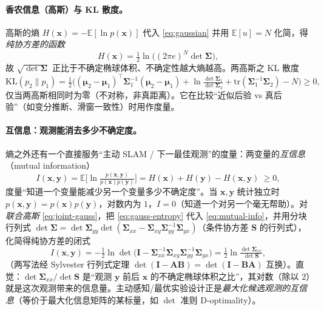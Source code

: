 \paragraph{香农信息（高斯）与 KL 散度。}
高斯的熵 $H(\mathbf{x})=-\mathbb{E}[\ln p(\mathbf{x})]$ 代入 \cref{eq:gaussian} 并用 $\mathbb{E}[u]=N$ 化简，得\emph{纯协方差的函数}
\begin{equation}
  H(\mathbf{x})=\tfrac12\ln\big((2\pi e)^N\det\boldsymbol{\Sigma}\big),
  \label{eq:gauss-entropy}
\end{equation}
故 $\sqrt{\det\boldsymbol{\Sigma}}$ 正比于不确定椭球体积、不确定性越大熵越高。两高斯之 KL 散度
\begin{equation}
  \mathrm{KL}(p_2\|p_1)=\tfrac12\Big((\boldsymbol{\mu}_2-\boldsymbol{\mu}_1)^\top\boldsymbol{\Sigma}_1^{-1}(\boldsymbol{\mu}_2-\boldsymbol{\mu}_1)+\ln\tfrac{\det\boldsymbol{\Sigma}_1}{\det\boldsymbol{\Sigma}_2}+\mathrm{tr}(\boldsymbol{\Sigma}_1^{-1}\boldsymbol{\Sigma}_2)-N\Big)\ge 0,
  \label{eq:gauss-kl}
\end{equation}
仅当两高斯相同时为零（不对称，非真距离）。它在比较“近似后验 vs 真后验”（如变分推断、滑窗一致性）时用作度量。

\paragraph{互信息：观测能消去多少不确定度。}
熵之外还有一个直接服务“主动 SLAM / 下一最佳观测”的度量：两变量的\emph{互信息}（mutual information）
\begin{equation}
  I(\mathbf{x},\mathbf{y})=\mathbb{E}\!\Big[\ln\tfrac{p(\mathbf{x},\mathbf{y})}{p(\mathbf{x})p(\mathbf{y})}\Big]
  =H(\mathbf{x})+H(\mathbf{y})-H(\mathbf{x},\mathbf{y})\ \ge 0,
  \label{eq:mutual-info}
\end{equation}
度量“知道一个变量能减少另一个变量多少不确定度”\cite{barfoot2024state}。当 $\mathbf{x},\mathbf{y}$ 统计独立时 $p(\mathbf{x},\mathbf{y})=p(\mathbf{x})p(\mathbf{y})$，对数内为 $1$，$I=0$（知道一个对另一个毫无帮助）。对\emph{联合高斯} \cref{eq:joint-gauss}，把 \cref{eq:gauss-entropy} 代入 \cref{eq:mutual-info}，并用分块行列式 $\det\boldsymbol{\Sigma}=\det\boldsymbol{\Sigma}_{yy}\det(\boldsymbol{\Sigma}_{xx}-\boldsymbol{\Sigma}_{xy}\boldsymbol{\Sigma}_{yy}^{-1}\boldsymbol{\Sigma}_{yx})$（条件协方差 $\mathbf{S}$ 的行列式），化简得纯协方差的闭式
\begin{equation}
  I(\mathbf{x},\mathbf{y})=-\tfrac12\ln\det\big(\mathbf{I}-\boldsymbol{\Sigma}_{xx}^{-1}\boldsymbol{\Sigma}_{xy}\boldsymbol{\Sigma}_{yy}^{-1}\boldsymbol{\Sigma}_{yx}\big)
  =\tfrac12\ln\tfrac{\det\boldsymbol{\Sigma}_{xx}}{\det\mathbf{S}},
  \label{eq:gauss-mutual-info}
\end{equation}
（两写法经 Sylvester 行列式定理 $\det(\mathbf{I}-\mathbf{A}\mathbf{B})=\det(\mathbf{I}-\mathbf{B}\mathbf{A})$ 互换）。直觉：$\det\boldsymbol{\Sigma}_{xx}/\det\mathbf{S}$ 是“观测 $\mathbf{y}$ 前后 $\mathbf{x}$ 的不确定椭球体积之比”，其对数（除以 $2$）就是这次观测带来的信息量。主动感知/最优实验设计正是\emph{最大化候选观测的互信息}（等价于最大化信息矩阵的某标量，如 $\det$ 准则 D-optimality）。

